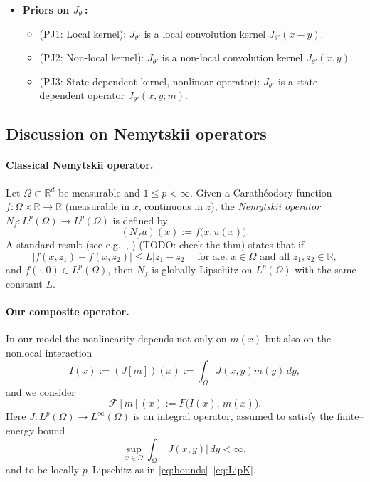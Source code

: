 \documentclass[11pt,a4paper]{article}
\theoremstyle{plain}
\theoremstyle{definition}
\theoremstyle{remark}
\begin{document}
\begin{itemize}
	\item \textbf{Priors on $J_{\theta\prime}$:}
	      \begin{itemize}
		      \item (PJ1: Local kernel): $J_{\theta\prime}$ is a local convolution kernel $J_{\theta\prime}(x-y)$.
		      \item (PJ2: Non-local kernel): $J_{\theta\prime}$ is a non-local convolution kernel $J_{\theta\prime}(x,y)$.
		      \item (PJ3: State-dependent kernel, nonlinear operator): $J_{\theta\prime}$ is a state-dependent operator $J_{\theta\prime}(x,y; m)$.
	      \end{itemize}
\end{itemize}

\subsection{Discussion on Nemytskii operators}

\paragraph{Classical Nemytskii operator.}
Let $\Omega\subset\mathbb R^d$ be measurable and $1\le p<\infty$.
Given a Carathéodory function $f:\Omega\times\mathbb R\to\mathbb R$
(measurable in $x$, continuous in $z$), the \emph{Nemytskii operator}
$N_f:L^p(\Omega)\to L^p(\Omega)$ is defined by
\[
	(N_f u)(x) := f\bigl(x,u(x)\bigr).
\]
A standard result (see e.g.\ \cite[Thm.~1.2.5]{amann1995linear},
\cite[Thm.~2.3.5]{pazy2012semigroups}) (TODO: check the thm) states that if
\[
	|f(x,z_1)-f(x,z_2)| \le L |z_1-z_2|
	\quad\text{for a.e. }x\in\Omega\text{ and all }z_1,z_2\in\mathbb R,
\]
and $f(\cdot,0)\in L^p(\Omega)$, then $N_f$ is globally Lipschitz on
$L^p(\Omega)$ with the same constant $L$.

\paragraph{Our composite operator.}
In our model the nonlinearity depends not only on $m(x)$
but also on the nonlocal interaction
\[
	I(x) := (J[m])(x) := \int_\Omega J(x,y)m(y)\,dy,
\]
and we consider
\[
	\mathcal F[m](x) := F\bigl(I(x),\,m(x)\bigr).
\]
Here $J:L^p(\Omega)\to L^\infty(\Omega)$ is an integral operator,
assumed to satisfy the finite–energy bound
\[
	\sup_{x\in\Omega}\int_\Omega |J(x,y)|\,dy < \infty,
\]
and to be locally $p$–Lipschitz as in \eqref{eq:bounds}–\eqref{eq:LipK}.
\end{document}
